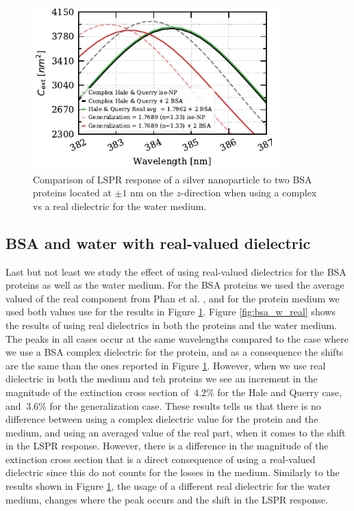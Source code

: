  \begin{figure} %
    \centering
    \includegraphics[width=0.85\textwidth]{bsa_w_real_water_diel.pdf} 
    \caption{Comparison of LSPR response of a silver nanoparticle to two BSA proteins located at $\pm1$ nm on the $z$-direction
    when using a complex vs a real dielectric for the water medium.}
    \label{fig:real_w_comp_bsa}
 \end{figure}

 \subsection{BSA and water with real-valued dielectric}

Last but not least we study the effect of using real-valued dielectrics for the BSA proteins as well as the water medium. For the BSA proteins 
we used the average valued of the real component from Phan et al. \cite{PhanETal2013}, and for the protein medium we used both values  
use for the results in Figure \ref{fig:real_w_comp_bsa}. Figure \ref{fig:bsa_w_real} shows the results of using real dielectrics in both the proteins and
the water medium. The peaks in all cases occur at the same wavelengths compared to the case where we use a BSA complex dielectric for the protein, and as a 
consequence the shifts are the same than the ones reported in Figure \ref{fig:real_w_comp_bsa}. However, when we use real dielectric in both the medium 
and teh proteins we see an increment in the magnitude of the extinction cross section of $~4.2\%$ for the Hale and Querry case, and $~3.6\%$ for the 
generalization case. These results tells us that there is no difference between using a complex dielectric value for the protein and the medium, and using 
an averaged value of the real part, when it comes to the shift in the LSPR response. However, there is a difference in the magnitude of the 
extinction cross section that is a direct consequence of using a real-valued dielectric since this do not counts for the losses in the medium. Similarly to the 
results shown in Figure \ref{fig:real_w_comp_bsa}, the usage of a different real dielectric for the water medium, changes where the peak occurs and the shift in the 
LSPR response. 

